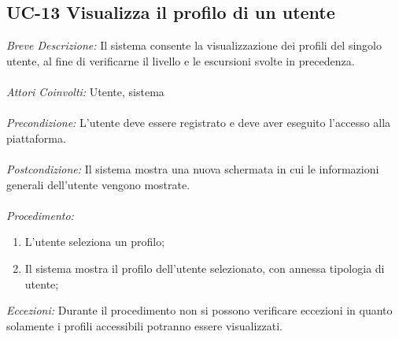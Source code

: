 \subsection{UC-13 Visualizza il profilo di un utente}
\textit{Breve Descrizione:} Il sistema consente la visualizzazione dei profili del singolo utente, al fine di verificarne il livello
 e le escursioni svolte in precedenza.
\\
\\
\textit{Attori Coinvolti:} Utente, sistema
\\ 
\\
\textit{Precondizione:} L'utente deve essere registrato e deve aver eseguito l'accesso alla piattaforma.
\\
\\
\textit{Postcondizione:} Il sistema mostra una nuova schermata in cui le informazioni generali dell'utente vengono mostrate.
\\ 
\\
\textit{Procedimento:}
\begin{enumerate}
	\item L'utente seleziona un profilo;
	\item Il sistema mostra il profilo dell'utente selezionato, con annessa tipologia di utente;
\end{enumerate}

\textit{Eccezioni:} Durante il procedimento non si possono verificare eccezioni in quanto solamente i profili accessibili potranno essere visualizzati.
\\
